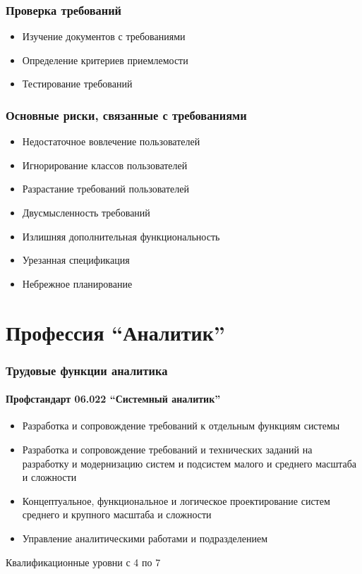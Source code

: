 \documentclass{../../slides-style}
\begin{document}
    \begin{frame}
        \frametitle{Проверка требований}
        \begin{itemize}
            \item Изучение документов с требованиями
            \item Определение критериев приемлемости
            \item Тестирование требований
        \end{itemize}
    \end{frame}

    \begin{frame}
        \frametitle{Основные риски, связанные с требованиями}
        \begin{itemize}
            \item Недостаточное вовлечение пользователей
            \item Игнорирование классов пользователей
            \item Разрастание требований пользователей
            \item Двусмысленность требований
            \item Излишняя дополнительная функциональность
            \item Урезанная спецификация
            \item Небрежное планирование
        \end{itemize}
    \end{frame}

    \section{Профессия \enquote{Аналитик}}

    \begin{frame}
        \frametitle{Трудовые функции аналитика}
        \framesubtitle{Профстандарт 06.022 \enquote{Системный аналитик}}
        \begin{itemize}
            \item Разработка и сопровождение требований к отдельным функциям системы
            \item Разработка и сопровождение требований и технических заданий на разработку и модернизацию систем и подсистем малого и среднего масштаба и сложности
            \item Концептуальное, функциональное и логическое проектирование систем среднего и крупного масштаба и сложности
            \item Управление аналитическими работами и подразделением
        \end{itemize}
        Квалификационные уровни с 4 по 7
    \end{frame}
\end{document}
